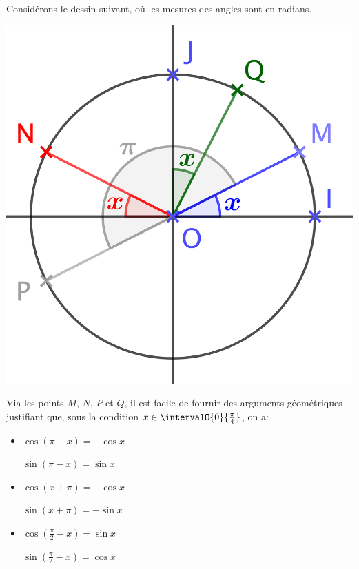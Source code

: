 Considérons le dessin suivant, où les mesures des angles sont en radians.

\begin{center}
	\includegraphics[scale = .7]{one-var-trig-formulas.png}
\end{center}

Via les points $M$, $N$, $P$ et $Q$, il est facile de fournir des arguments géométriques justifiant que, sous la condition $x \in \intervalO{0}{\frac{\pi}{4}}$, on a:
%
\begin{multicols}{3}
\begin{itemize}[label=\small\textbullet]
	\item $\cos (\pi - x) = - \cos x$

	      \noindent
	      $\sin (\pi - x) = \sin x$ 

	\item $\cos (x + \pi) = - \cos x$

	      \noindent
	      $\sin (x + \pi) = - \sin x$

	\item $\cos \left( \frac{\pi}{2} - x \right) = \sin x$

	      \noindent
	      $\sin \left( \frac{\pi}{2} - x \right) = \cos x$ 
\end{itemize}
\end{multicols}


